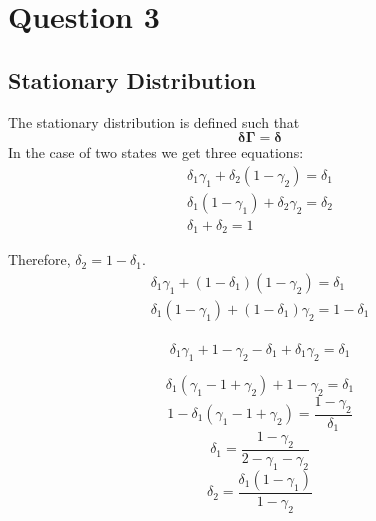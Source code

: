 \documentclass[11pt]{article}
\begin{document}
\setcounter{section}{2}
\section{Question 3}
\label{sec:question-3}


\subsection{Stationary Distribution}
\label{sec:stat-distr}

The stationary distribution is defined such that
\begin{equation}
  \label{eq:11}
  \mathbf{\delta}\mathbf{\Gamma}=\mathbf{\delta}
\end{equation}
In the case of two states we get three equations:
\begin{equation}
  \label{eq:12}
  \begin{split}
    \delta_1 \gamma_1 + \delta_2 (1-\gamma_2) = \delta_1\\
    \delta_1 (1-\gamma_1) + \delta_2 \gamma_2 = \delta_2\\
    \delta_1 + \delta_2 = 1
  \end{split}
\end{equation}

Therefore, $\delta_2 = 1- \delta_1$.
\begin{equation}
  \label{eq:13}
  \begin{split}
    \delta_1 \gamma_1 + (1-\delta_1) (1-\gamma_2) = \delta_1\\
    \delta_1 (1-\gamma_1) + (1-\delta_1) \gamma_2 = 1-\delta_1\\
  \end{split}
\end{equation}

\begin{equation*}
  \delta_1 \gamma_1 + 1-\gamma_2 -\delta_1 + \delta_1 \gamma_2 = \delta_1
\end{equation*}

\begin{equation*}
  \delta_1 (\gamma_1 -1 + \gamma_2) + 1-\gamma_2 = \delta_1
\end{equation*}
\begin{equation*}
  1-\delta_1 (\gamma_1 -1 + \gamma_2)  = \frac{1-\gamma_2}{\delta_1}
\end{equation*}
\begin{equation}
  \label{eq:14}
  \delta_1 = \frac{1-\gamma_2}{2-\gamma_1-\gamma_2}
\end{equation}
\begin{equation}
  \label{eq:15}
  \delta_2 = \frac{\delta_1 (1-\gamma_1)}{1-\gamma_2}
\end{equation}
\end{document}
